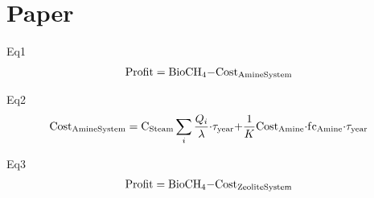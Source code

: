 \documentclass[10pt,a4paper]{article}
\begin{document}
%

\section{Paper}
Eq1
\begin{align}
	{\rm{Profit = BioC}}{{\rm{H}}_{\rm{4}}}{\rm{ - Cos}}{{\rm{t}}_{{\rm{Amine System}}}}
\end{align}

Eq2
\begin{align}
	{\rm{Cos}}{{\rm{t}}_{{\rm{Amine System}}}} = {{\rm{C}}_{{\rm{Steam}}}}\sum\limits_i {\frac{{{Q_i}}}{\lambda }} {\rm{\cdot}}{\tau _{{\rm{year}}}}{\rm{ + }}\frac{1}{K}{\rm{Cos}}{{\rm{t}}_{{\rm{Amine}}}}{\rm{\cdot f}}{{\rm{c}}_{{\rm{Amine}}}}{\rm{\cdot}}{\tau _{{\rm{year}}}}
\end{align}

Eq3
\begin{align}
	{\rm{Profit = BioC}}{{\rm{H}}_{\rm{4}}}{\rm{ - Cos}}{{\rm{t}}_{{\rm{Zeolite System}}}}
\end{align}
\end{document}
